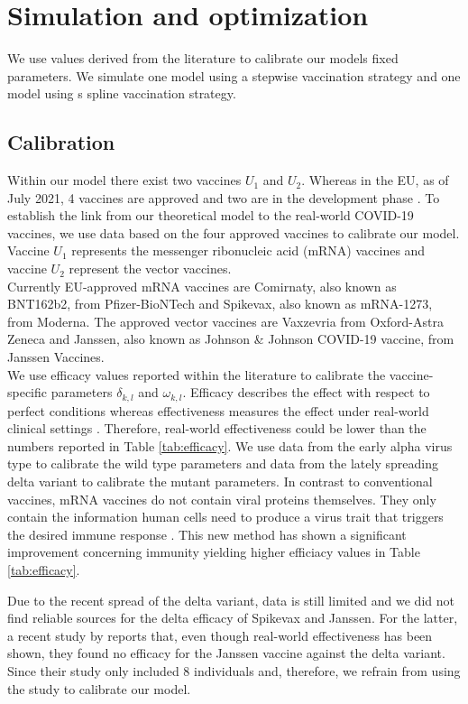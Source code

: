 \section{Simulation and optimization}
We use values derived from the literature to calibrate our models fixed parameters. We simulate one model using a stepwise vaccination strategy and one model using s spline vaccination strategy.


\subsection{Calibration}
Within our model there  exist two vaccines $U_1$ and $U_2$. Whereas in the EU, as of July 2021, 4 vaccines are approved and two are in the development phase \citep{ECa.2021}. To establish the link from our theoretical model to the real-world COVID-19 vaccines, we use data based on the four approved vaccines to calibrate our model. Vaccine $U_1$ represents the messenger ribonucleic acid (mRNA) vaccines and vaccine $U_2$ represent the vector vaccines. \\

Currently EU-approved mRNA vaccines are Comirnaty, also known as BNT162b2, from Pfizer-BioNTech and Spikevax, also known as mRNA-1273, from Moderna. The approved vector vaccines are Vaxzevria from Oxford-Astra Zeneca and Janssen, also known as Johnson \& Johnson COVID-19 vaccine, from Janssen Vaccines. \\
 
We use efficacy values reported within the literature to calibrate the vaccine-specific parameters $\delta_{k,l}$ and $\omega_{k,l}$. Efficacy describes the effect with respect to perfect conditions whereas effectiveness measures the effect under real-world clinical settings \citep{Gartlehner.2006}. Therefore, real-world effectiveness could be lower than the numbers reported in Table \ref{tab:efficacy}. 
We use data from the early alpha virus type to calibrate the wild type parameters and data from the lately spreading delta variant to calibrate the mutant parameters.  In contrast to conventional vaccines, mRNA vaccines do not contain viral proteins themselves. They only contain the information human cells need to produce a virus trait that triggers the desired immune response \citep{Biontech.2021}. This new method has shown a significant improvement concerning immunity yielding higher efficiacy values in Table \ref{tab:efficacy}. 


Due to the recent spread of the delta variant, data is still limited and we did not find reliable sources for the delta efficacy of Spikevax and Janssen. For the latter, a recent study by \cite{Jongeneelen.2021} reports that, even though real-world effectiveness has been shown, they found no efficacy for the Janssen vaccine against the delta variant. Since their study only included 8 individuals and, therefore, we refrain from using the study to calibrate our model. \\

